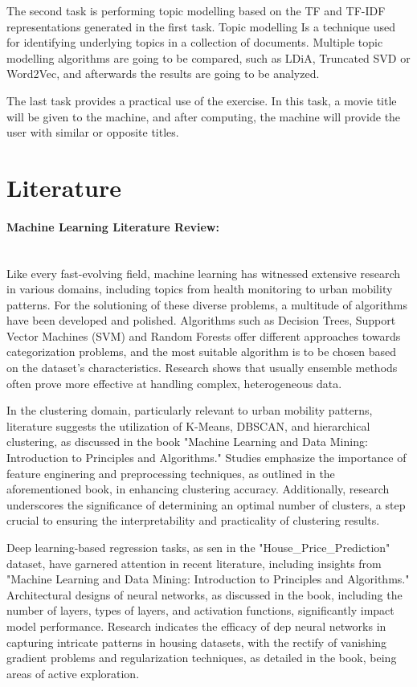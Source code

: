 \documentclass{article}
\begin{document}
\begin{multicols}{2}
The second task is performing topic modelling based on the TF and TF-IDF representations generated in the first task. Topic modelling Is a technique used for identifying underlying topics in a collection of documents. Multiple topic modelling algorithms are going to be compared, such as LDiA, Truncated SVD or Word2Vec, and afterwards the results are going to be analyzed.

The last task provides a practical use of the exercise. In this task, a movie title will be given to the machine, and after computing, the machine will provide the user with similar or opposite titles.


\section{Literature}

\paragraph*{\textbf{Machine Learning Literature Review:}}\mbox{}\\
Like every fast-evolving field, machine learning has witnessed extensive research in various domains, including topics from health monitoring to urban mobility patterns. For the solutioning of these diverse problems, a multitude of algorithms have been developed and polished. Algorithms such as Decision Trees, Support Vector Machines (SVM) and Random Forests offer different approaches towards categorization problems, and the most suitable algorithm is to be chosen based on the dataset's characteristics. Research shows that usually ensemble methods often prove more effective at handling complex, heterogeneous data.

In the clustering domain, particularly relevant to urban mobility patterns, literature suggests the utilization of K-Means, DBSCAN, and hierarchical clustering, as discussed in the book "Machine Learning and Data Mining: Introduction to Principles and Algorithms." Studies emphasize the importance of feature enginering and preprocessing techniques, as outlined in the aforementioned book, in enhancing clustering accuracy. Additionally, research underscores the significance of determining an optimal number of clusters, a step crucial to ensuring the interpretability and practicality of clustering results.

Deep learning-based regression tasks, as sen in the "House\_Price\_Prediction" dataset, have garnered attention in recent literature, including insights from "Machine Learning and Data Mining: Introduction to Principles and Algorithms." Architectural designs of neural networks, as discussed in the book, including the number of layers, types of layers, and activation functions, significantly impact model performance. Research indicates the efficacy of dep neural networks in capturing intricate patterns in housing datasets, with the rectify of vanishing gradient problems and regularization techniques, as detailed in the book, being areas of active exploration.


\end{multicols}
\end{document}
